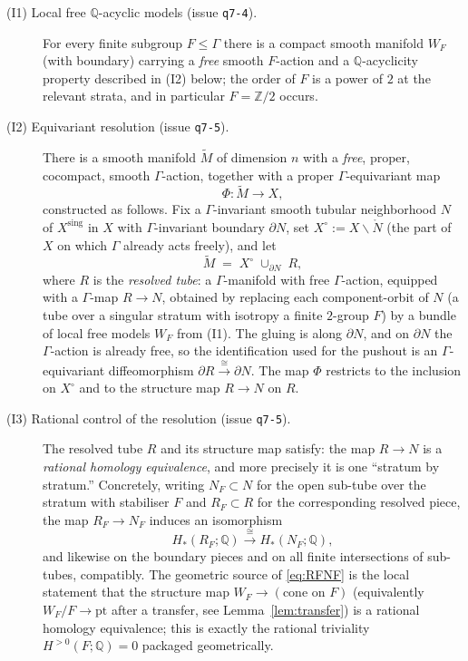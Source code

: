 \documentclass[12pt]{article}
\begin{document}
\begin{description}
\item[(I1) Local free $\mathbb{Q}$-acyclic models (issue \texttt{q7-4}).]
For every finite subgroup $F\le\Gamma$ there is a compact smooth manifold
$W_F$ (with boundary) carrying a \emph{free} smooth $F$-action and a
$\mathbb{Q}$-acyclicity property described in (I2) below; the order of $F$ is a
power of $2$ at the relevant strata, and in particular $F=\mathbb{Z}/2$ occurs.

\item[(I2) Equivariant resolution (issue \texttt{q7-5}).]
There is a smooth manifold $\widetilde M$ of dimension $n$ with a
\emph{free}, proper, cocompact, smooth $\Gamma$-action, together with a proper
$\Gamma$-equivariant map
\[
  \Phi:\widetilde M\longrightarrow X ,
\]
constructed as follows. Fix a $\Gamma$-invariant smooth tubular neighborhood
$N$ of $X^{\mathrm{sing}}$ in $X$ with $\Gamma$-invariant boundary
$\partial N$, set $X^\circ:=X\smallsetminus \mathring N$ (the part of $X$ on
which $\Gamma$ already acts freely), and let
\[
  \widetilde M \;=\; X^\circ \;\cup_{\partial N}\; R ,
\]
where $R$ is the \emph{resolved tube}: a $\Gamma$-manifold with free
$\Gamma$-action, equipped with a $\Gamma$-map $R\to N$, obtained by replacing
each component-orbit of $N$ (a tube over a singular stratum with isotropy a
finite $2$-group $F$) by a bundle of local free models $W_F$ from (I1). The
gluing is along $\partial N$, and on $\partial N$ the $\Gamma$-action is
already free, so the identification used for the pushout is an
$\Gamma$-equivariant diffeomorphism $\partial R \xrightarrow{\ \cong\ }
\partial N$. The map $\Phi$ restricts to the inclusion on $X^\circ$ and to the
structure map $R\to N$ on $R$.

\item[(I3) Rational control of the resolution (issue \texttt{q7-5}).]
The resolved tube $R$ and its structure map satisfy: the map $R\to N$ is a
\emph{rational homology equivalence}, and more precisely it is one
``stratum by stratum.'' Concretely, writing $N_F\subset N$ for the open
sub-tube over the stratum with stabiliser $F$ and $R_F\subset R$ for the
corresponding resolved piece, the map $R_F\to N_F$ induces an isomorphism
\begin{equation}\label{eq:RFNF}
  H_*(R_F;\mathbb{Q})\xrightarrow{\ \cong\ }H_*(N_F;\mathbb{Q}),
\end{equation}
and likewise on the boundary pieces and on all finite intersections of
sub-tubes, compatibly. The geometric source of \eqref{eq:RFNF} is the
local statement that the structure map $W_F\to (\text{cone on }F)$
(equivalently $W_F/F\to \mathrm{pt}$ after a transfer, see
Lemma~\ref{lem:transfer}) is a rational homology equivalence; this is exactly
the rational triviality $H^{>0}(F;\mathbb{Q})=0$ packaged geometrically.


\end{description}
\end{document}
